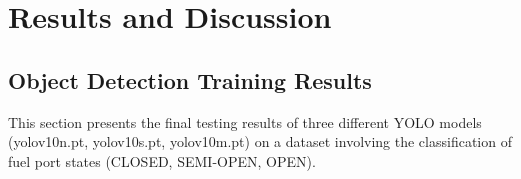 \documentclass[12pt,oneside]{book} %
\begin{document}
\chapter{Results and Discussion}\label{chap:results}

\section{Object Detection Training Results}

This section presents the final testing results of three different YOLO models
(yolov10n.pt, yolov10s.pt, yolov10m.pt) on a dataset involving the
classification of fuel port states (CLOSED, SEMI-OPEN, OPEN).
\end{document}
